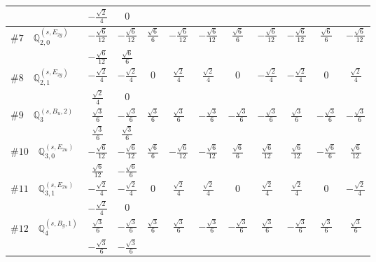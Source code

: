 \documentclass[fleqn,9pt,landscape]{jsarticle}
\begin{document}
\begin{center}
\begin{longtable}{lcccccccccc}
& $ - \frac{\sqrt{2}}{4} $ & $ 0 $ & $  $ & $  $ & $  $ & $  $ & $  $ & $  $ & $  $ & $  $ \\ \hline
$ \#7\quad \mathbb{Q}_{2,0}^{(s,E_{2g})} $ & $ - \frac{\sqrt{6}}{12} $ & $ - \frac{\sqrt{6}}{12} $ & $ \frac{\sqrt{6}}{6} $ & $ - \frac{\sqrt{6}}{12} $ & $ - \frac{\sqrt{6}}{12} $ & $ \frac{\sqrt{6}}{6} $ & $ - \frac{\sqrt{6}}{12} $ & $ - \frac{\sqrt{6}}{12} $ & $ \frac{\sqrt{6}}{6} $ & $ - \frac{\sqrt{6}}{12} $ \\
& $ - \frac{\sqrt{6}}{12} $ & $ \frac{\sqrt{6}}{6} $ & $  $ & $  $ & $  $ & $  $ & $  $ & $  $ & $  $ & $  $ \\ \hline
$ \#8\quad \mathbb{Q}_{2,1}^{(s,E_{2g})} $ & $ - \frac{\sqrt{2}}{4} $ & $ - \frac{\sqrt{2}}{4} $ & $ 0 $ & $ \frac{\sqrt{2}}{4} $ & $ \frac{\sqrt{2}}{4} $ & $ 0 $ & $ - \frac{\sqrt{2}}{4} $ & $ - \frac{\sqrt{2}}{4} $ & $ 0 $ & $ \frac{\sqrt{2}}{4} $ \\
& $ \frac{\sqrt{2}}{4} $ & $ 0 $ & $  $ & $  $ & $  $ & $  $ & $  $ & $  $ & $  $ & $  $ \\ \hline
$ \#9\quad \mathbb{Q}_{3}^{(s,B_{u},2)} $ & $ \frac{\sqrt{3}}{6} $ & $ - \frac{\sqrt{3}}{6} $ & $ \frac{\sqrt{3}}{6} $ & $ \frac{\sqrt{3}}{6} $ & $ - \frac{\sqrt{3}}{6} $ & $ - \frac{\sqrt{3}}{6} $ & $ - \frac{\sqrt{3}}{6} $ & $ \frac{\sqrt{3}}{6} $ & $ - \frac{\sqrt{3}}{6} $ & $ - \frac{\sqrt{3}}{6} $ \\
& $ \frac{\sqrt{3}}{6} $ & $ \frac{\sqrt{3}}{6} $ & $  $ & $  $ & $  $ & $  $ & $  $ & $  $ & $  $ & $  $ \\ \hline
$ \#10\quad \mathbb{Q}_{3,0}^{(s,E_{2u})} $ & $ - \frac{\sqrt{6}}{12} $ & $ - \frac{\sqrt{6}}{12} $ & $ \frac{\sqrt{6}}{6} $ & $ - \frac{\sqrt{6}}{12} $ & $ - \frac{\sqrt{6}}{12} $ & $ \frac{\sqrt{6}}{6} $ & $ \frac{\sqrt{6}}{12} $ & $ \frac{\sqrt{6}}{12} $ & $ - \frac{\sqrt{6}}{6} $ & $ \frac{\sqrt{6}}{12} $ \\
& $ \frac{\sqrt{6}}{12} $ & $ - \frac{\sqrt{6}}{6} $ & $  $ & $  $ & $  $ & $  $ & $  $ & $  $ & $  $ & $  $ \\ \hline
$ \#11\quad \mathbb{Q}_{3,1}^{(s,E_{2u})} $ & $ - \frac{\sqrt{2}}{4} $ & $ - \frac{\sqrt{2}}{4} $ & $ 0 $ & $ \frac{\sqrt{2}}{4} $ & $ \frac{\sqrt{2}}{4} $ & $ 0 $ & $ \frac{\sqrt{2}}{4} $ & $ \frac{\sqrt{2}}{4} $ & $ 0 $ & $ - \frac{\sqrt{2}}{4} $ \\
& $ - \frac{\sqrt{2}}{4} $ & $ 0 $ & $  $ & $  $ & $  $ & $  $ & $  $ & $  $ & $  $ & $  $ \\ \hline
$ \#12\quad \mathbb{Q}_{4}^{(s,B_{g},1)} $ & $ \frac{\sqrt{3}}{6} $ & $ - \frac{\sqrt{3}}{6} $ & $ \frac{\sqrt{3}}{6} $ & $ \frac{\sqrt{3}}{6} $ & $ - \frac{\sqrt{3}}{6} $ & $ - \frac{\sqrt{3}}{6} $ & $ \frac{\sqrt{3}}{6} $ & $ - \frac{\sqrt{3}}{6} $ & $ \frac{\sqrt{3}}{6} $ & $ \frac{\sqrt{3}}{6} $ \\
& $ - \frac{\sqrt{3}}{6} $ & $ - \frac{\sqrt{3}}{6} $ & $  $ & $  $ & $  $ & $  $ & $  $ & $  $ & $  $ & $  $ \\
\end{longtable}
\end{center}
\end{document}

